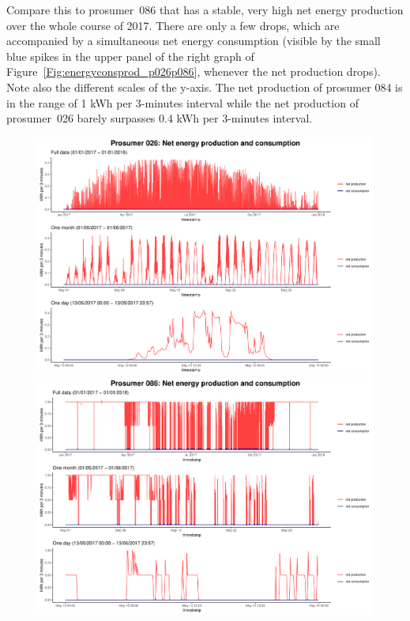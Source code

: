 Compare this to prosumer~086 that has a stable, very high net energy production over the whole course of 2017. There are only a few drops, which are accompanied by a simultaneous net energy consumption (visible by the small blue spikes in the upper panel of the right graph of Figure~\ref{Fig:energyconsprod_p026p086}, whenever the net production drops). Note also the different scales of the y-axis. The net production of prosumer 084 is in the range of 1 kWh per 3-minutes interval while the net production of prosumer~026 barely surpasses 0.4 kWh per 3-minutes interval.
%
\begin{figure}
\centering
\begin{minipage}[h]{\dimexpr.5\textwidth-0.15em}
\includegraphics[width=\textwidth]{thesis/graphs/timeseries/p026_prod&cons.pdf}
\end{minipage}
\begin{minipage}[h]{\dimexpr.5\textheight-0.15em}
\includegraphics[width=\textwidth]{thesis/graphs/timeseries/p086_prod&cons.pdf}
\end{minipage}


\end{figure}
